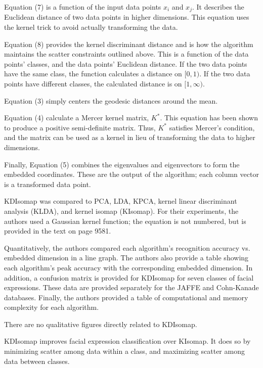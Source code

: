 \documentclass[11pt]{article}
\begin{document}
\begin{description}[leftmargin=0in]
        Equation (7) is a function of the input data points $x_i$ and $x_j$. It
        describes the Euclidean distance of two data points in higher
        dimensions. This equation uses the kernel trick to avoid actually
        transforming the data.

        Equation (8) provides the kernel discriminant distance and is how the
        algorithm maintains the scatter constraints outlined above. This is a
        function of the data points' classes, and the data points' Euclidean
        distance. If the two data points have the same class, the function
        calculates a distance on $[0, 1)$. If the two data points have different
        classes, the calculated distance is on $[1, \infty)$.

        Equation (3) simply centers the geodesic distances around the mean.

        Equation (4) calculate a Mercer kernel matrix, $K^*$. This
        equation has been shown to produce a positive semi-definite matrix.
        Thus, $K^*$ satisfies Mercer's condition, and the matrix can be used
        as a kernel in lieu of transforming the data to higher dimensions.

        Finally, Equation (5) combines the eigenvalues and eigenvectors to form
        the embedded coordinates. These are the output of the algorithm; each
        column vector is a transformed data point.

    \item [Experiments] KDIsomap was compared to PCA, LDA, KPCA, kernel linear
        discriminant analysis (KLDA), and kernel isomap (KIsomap). For their
        experiments, the authors used a Gaussian kernel function; the equation
        is not numbered, but is provided in the text on page 9581.

        Quantitatively, the authors compared each algorithm's recognition
        accuracy vs. embedded dimension in a line graph. The authors also
        provide a table showing each algorithm's peak accuracy with the
        corresponding embedded dimension. In addition, a confusion matrix is
        provided for KDIsomap for seven classes of facial expressions. These
        data are provided separately for the JAFFE and Cohn-Kanade databases.
        Finally, the authors provided a table of computational and memory
        complexity for each algorithm.

        There are no qualitative figures directly related to KDIsomap.

    \item [Contributions] KDIsomap improves facial expression classification
        over KIsomap. It does so by minimizing scatter among data within a
        class, and maximizing scatter among data between classes.


\end{description}
\end{document}

